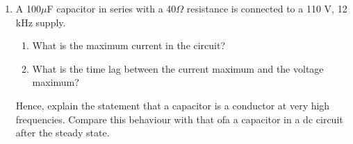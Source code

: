 \begin{enumerate}[label=\thesection.\arabic*,ref=\thesection.\theenumi]
\item A 100$\mu$F capacitor in series with a 40$\Omega$ resistance is connected to a 110 V, 12 kHz supply.
\begin{enumerate}[label=\alph*)]
	\item What is the maximum current in the circuit?
	\item What is the time lag between the current maximum and the voltage maximum?
\end{enumerate}
Hence, explain the statement that a capacitor is a conductor at very high frequencies. Compare this behaviour with that ofa a capacitor in a dc circuit after the steady state.\\
\solution
\pagebreak

\end{enumerate}
